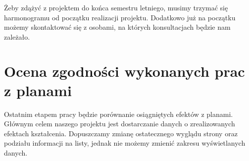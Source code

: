 \documentclass{article}
\begin{document}
Żeby zdążyć z projektem do końca semestru letniego, musimy trzymać się harmonogramu od początku realizacji projektu. 
Dodatkowo już na początku możemy skontaktować się z osobami, na których konsultacjach będzie nam zależało.


\section{Ocena zgodności wykonanych prac z planami}
Ostatnim etapem pracy będzie porównanie osiągniętych efektów z planami.
Głównym celem naszego projektu jest dostarczanie danych o zrealizowanych efektach kształcenia.
Dopuszczamy zmianę ostatecznego wyglądu strony oraz podziału informacji na listy, jednak nie możemy zmienić zakresu wyświetlanych danych.
\end{document}
